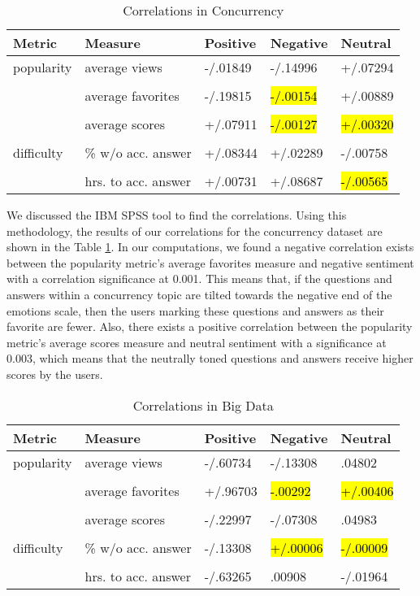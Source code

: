 \begin{table}[t!hb]
\caption{Correlations in Concurrency}
\label{tab:ConcPopl}
\centering
\begin{tabular}{p{0.7in}p{1.7in}p{0.7in}p{0.7in}p{0.7in}} \hline
\textbf{Metric} & \textbf{Measure} & \textbf{Positive} & \textbf{Negative} & \textbf{Neutral} \\
\hline
popularity & average views & -/.01849 & -/.14996 & +/.07294 \\
\\
& average favorites & -/.19815 & \hl{-/.00154} & +/.00889 \\ 
\\
& average scores & +/.07911 & \hl{-/.00127} & \hl{+/.00320} \\
\\
difficulty & \% w/o acc. answer & +/.08344 & +/.02289 & -/.00758 \\
\\
& hrs. to acc. answer & +/.00731 & +/.08687 & \hl{-/.00565} \\ \hline
\end{tabular}
\end{table}

We discussed the IBM SPSS tool to find the correlations. Using this methodology, the results of our correlations for the concurrency dataset are shown in the Table \ref{tab:ConcPopl}. In our computations, we found a negative correlation exists between the popularity metric's average favorites measure and negative sentiment with a correlation significance at 0.001. This means that, if the questions and answers within a concurrency topic are tilted towards the negative end of the emotions scale, then the users marking these questions and answers as their favorite are fewer. Also, there exists a positive correlation between the popularity metric's average scores measure and neutral sentiment with a significance at 0.003, which means that the neutrally toned questions and answers receive higher scores by the users.

\begin{table}[t!hb]
\caption{Correlations in Big Data}
\label{tab:PoplCorr}
\centering

\begin{tabular}{p{0.7in}p{1.7in}p{0.7in}p{0.7in}p{0.7in}} \hline
\textbf{Metric} & \textbf{Measure} & \textbf{Positive} & \textbf{Negative} & \textbf{Neutral} \\
\hline
popularity & average views & -/.60734 & -/.13308 &.04802 \\
\\
& average favorites & +/.96703 & \hl{-.00292} & \hl{+/.00406} \\ 
\\
& average scores & -/.22997 & -/.07308 & .04983 \\
\\
difficulty & \% w/o acc. answer & -/.13308 & \hl{+/.00006} & \hl{-/.00009} \\
\\
& hrs. to acc. answer & -/.63265 & .00908 & -/.01964 \\ \hline
\end{tabular}
\end{table}

